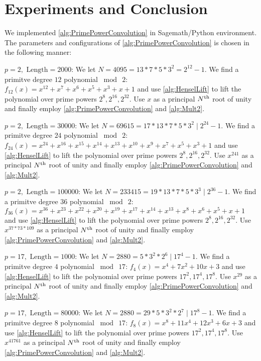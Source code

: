 \section{Experiments and Conclusion}
We implemented \cref{alg:PrimePowerConvolution} in Sagemath/Python \cite{OTHER:Stein05} environment. The parameters and configurations of \cref{alg:PrimePowerConvolution} is chosen in the following manner:

{\bf \(p = 2, \text{ Length} = 2000\)}: We let \(N = 4095 = 13 * 7 * 5 * 3^2 = 2^{12} - 1\). We find a primitve degree \(12\) polynomial \(\bmod \  2\): \(f_{12}(x) = x^{12} + x^7 + x^6 + x^5 + x^3 + x + 1\) and use \cref{alg:HenselLift} to lift the polynomial over prime powers \(2^8, 2^{16}, 2^{32}\). Use \(x\) as a principal \(N\textsuperscript{th}\) root of unity and finally employ \cref{alg:PrimePowerConvolution} and \cref{alg:Mult2}.

{\bf \(p = 2, \text{ Length} = 30000\)}: We let \(N = 69615 = 17 * 13 * 7 * 5 * 3^2 \mid 2^{24} - 1\). We find a primitve degree \(24\) polynomial \(\bmod \  2\): \(f_{24}(x) = x^{24} + x^{16} + x^{15} + x^{14} + x^{13} + x^{10} + x^9 + x^7 + x^5 + x^3 + 1\) and use \cref{alg:HenselLift} to lift the polynomial over prime powers \(2^8, 2^{16}, 2^{32}\). Use \(x^{241} \) as a principal \(N\textsuperscript{th}\) root of unity and finally employ \cref{alg:PrimePowerConvolution} and \cref{alg:Mult2}.

{\bf \(p = 2, \text{ Length} = 100000\)}: We let \(N = 233415 = 19 * 13 * 7 * 5 * 3^3 \mid 2^{36} - 1\). We find a primitve degree \(36\) polynomial \(\bmod \  2\): \(f_{36}(x) = x^{36} + x^{23} + x^{22} + x^{20} + x^{19} + x^{17} + x^{14} + x^{13} + x^8 + x^6 + x^5 + x + 1\) and use \cref{alg:HenselLift} to lift the polynomial over prime powers \(2^8, 2^{16}, 2^{32}\). Use \(x^{37*73*109} \) as a principal \(N\textsuperscript{th}\) root of unity and finally employ \cref{alg:PrimePowerConvolution} and \cref{alg:Mult2}.

{\bf \(p = 17, \text{ Length} = 1000\)}: We let \(N = 2880 = 5 * 3^2 * 2^6 \mid 17^{4} - 1\). We find a primitve degree \(4\) polynomial \(\bmod \  17\): \(f_{4}(x) = x^4 + 7x^2 + 10x + 3\) and use \cref{alg:HenselLift} to lift the polynomial over prime powers \(17^2, 17^4, 17^8\). Use \(x^{29} \) as a principal \(N\textsuperscript{th}\) root of unity and finally employ \cref{alg:PrimePowerConvolution} and \cref{alg:Mult2}.

{\bf \(p = 17, \text{ Length} = 80000\)}: We let \(N = 2880 = 29 * 5 * 3^2 * 2^7 \mid 17^{8} - 1\). We find a primitve degree \(8\) polynomial \(\bmod \  17\): \(f_{8}(x) = x^8 + 11x^4 + 12x^3 + 6x + 3\) and use \cref{alg:HenselLift} to lift the polynomial over prime powers \(17^2, 17^4, 17^8\). Use \(x^{41761} \) as a principal \(N\textsuperscript{th}\) root of unity and finally employ \cref{alg:PrimePowerConvolution} and \cref{alg:Mult2}.

